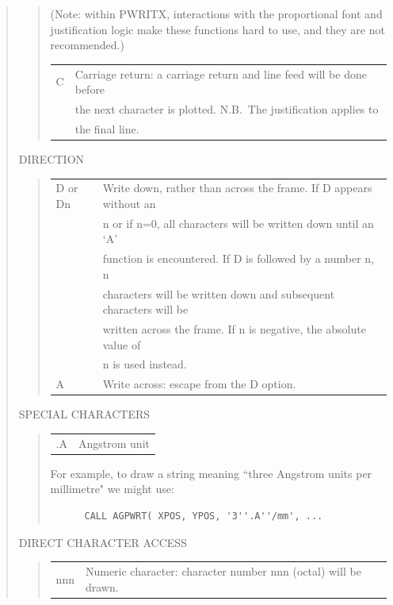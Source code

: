 \documentclass[twoside,11pt]{article}
\renewcommand{\_}{\texttt{\symbol{95}}}
\begin{document}
\begin{quote}
\begin{quote}
(Note: within PWRITX, interactions with the proportional font
and justification logic make these functions hard to use, and
they are not recommended.)

\begin{tabular}{ll}
C & Carriage return: a carriage return and line feed will be done before\\
 & the next character is plotted. N.B.\ The justification applies to\\
 & the final line.
\end{tabular}
\end{quote}

DIRECTION

\begin{quote}
\begin{tabular}{ll}
D or Dn & Write down, rather than across the frame.  If D appears without an\\
 & n or if n=0, all characters will be written down until an `A'\\
 & function is encountered.  If D is followed by a number n, n\\
 & characters will be written down and subsequent characters will be\\
 & written across the frame.  If n is negative, the absolute value of\\
 & n is used instead.\\
A & Write across: escape from the D option.
\end{tabular}
\end{quote}

SPECIAL CHARACTERS

\begin{quote}
\begin{tabular}{ll}
.A & Angstrom unit
\end{tabular}

For example, to draw a string meaning ``three Angstrom units per
millimetre" we might use:

\begin{verbatim}
      CALL AGPWRT( XPOS, YPOS, '3''.A''/mm', ...
\end{verbatim}
\end{quote}

DIRECT CHARACTER ACCESS

\begin{quote}
\begin{tabular}{ll}
nnn & Numeric character: character number nnn (octal) will be drawn.
\end{tabular}
\end{quote}
\end{quote}
\end{document}
